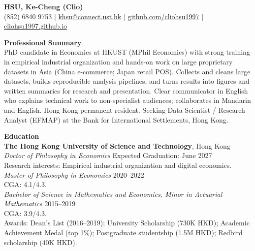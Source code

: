 \documentclass[11pt,letterpaper]{article}
\begin{document}
{\Large \textbf{HSU, Ke-Cheng (Clio)}}\\[1pt]
(852) 6840 9753 \quad $|$ \quad \href{mailto:khsu@connect.ust.hk}{khsu@connect.ust.hk} \quad $|$ \quad \href{https://github.com/cliohsu1997}{github.com/cliohsu1997} \quad $|$ \quad \href{https://cliohsu1997.github.io/}{cliohsu1997.github.io}

\vspace{0.15pt}

{\large \textbf{Professional Summary}}\\[-0.5pt]
PhD candidate in Economics at HKUST (MPhil Economics) with strong training in empirical industrial organization and hands-on work on large proprietary datasets in Asia (China e-commerce; Japan retail POS). Collects and cleans large datasets, builds reproducible analysis pipelines, and turns results into figures and written summaries for research and presentation. Clear communicator in English who explains technical work to non-specialist audiences; collaborates in Mandarin and English. Hong Kong permanent resident. Seeking Data Scientist / Research Analyst (EFMAP) at the Bank for International Settlements, Hong Kong.

\vspace{0.15pt}

{\large \textbf{Education}}\\[-0.5pt]
\textbf{The Hong Kong University of Science and Technology}, Hong Kong\\
\textit{Doctor of Philosophy in Economics} \hfill Expected Graduation: June 2027\\
Research interests: Empirical industrial organization and digital economics.\\
\textit{Master of Philosophy in Economics} \hfill 2020--2022\\
CGA: 4.1/4.3.\\
\textit{Bachelor of Science in Mathematics and Economics, Minor in Actuarial Mathematics} \hfill 2015--2019\\
CGA: 3.9/4.3.\\
Awards: Dean's List (2016--2019); University Scholarship (730K HKD); Academic Achievement Medal (top 1\%); Postgraduate studentship (1.5M HKD); Redbird scholarship (40K HKD).

\vspace{0.15pt}
\end{document}
